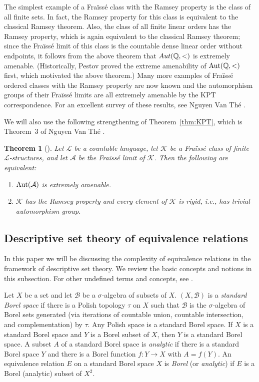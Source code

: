 \documentclass{amsart}
\newtheorem{theorem}{Theorem}[section]
\theoremstyle{definition}
\theoremstyle{remark}
\begin{document}
The simplest example of a Fra\"iss\'e class with the Ramsey property is the class of all finite sets. In fact, the Ramsey property for this class is equivalent to the classical Ramsey theorem. Also, the class of all finite linear orders has the Ramsey property, which is again equivalent to the classical Ramsey theorem; since the Fra\"iss\'e limit of this class is the countable dense linear order without endpoints, it follows from the above theorem that ${\rm Aut}(\mathbb{Q}, <)$ is extremely amenable. (Historically, Pestov \cite{Pestov98} proved the extreme amenability of $\mbox{\rm Aut}(\mathbb{Q},<)$ first, which motivated the above theorem.) Many more examples of Fra\"iss\'e ordered classes with the Ramsey property are now known and the automorphism groups of their Fra\"iss\'e limits are all extremely amenable by the KPT correspondence. For an excellent survey of these results, see Nguyen Van Th\'e \cite{NVT}. 

We will also use the following strengthening of Theorem~\ref{thm:KPT}, which is Theorem~3 of Nguyen Van Th\'e \cite{NVT}.

\begin{theorem}[\cite{NVT}]\label{thm:KPTstrong} Let $\mathcal{L}$ be a countable language, let $\mathcal{K}$ be a Fra\"iss\'e class of finite $\mathcal{L}$-structures, and let $\mathcal{A}$ be the Fra\"iss\'e limit of $\mathcal{K}$. Then the following are equivalent:
\begin{enumerate}
\item[\rm (1)] $\mbox{\rm Aut}(\mathcal{A})$ is extremely amenable.
\item[\rm (2)] $\mathcal{K}$ has the Ramsey property and every element of $\mathcal{K}$ is rigid, i.e., has trivial automorphism group.
\end{enumerate}
\end{theorem}



\subsection{Descriptive set theory of equivalence relations\label{subsec:er}}
In this paper we will be discussing the complexity of equivalence relations in the framework of descriptive set theory. We review the basic concepts and notions in this subsection. For other undefined terms and concepts, see \cite{GaoBook}.

Let $X$ be a set and let $\mathcal{B}$ be a $\sigma$-algebra of subsets of $X$. $(X, \mathcal{B})$ is a {\em standard Borel space} if there is a Polish topology $\tau$ on $X$ such that $\mathcal{B}$ is the $\sigma$-algebra of Borel sets generated (via iterations of countable union, countable intersection, and complementation) by $\tau$. Any Polish space is a standard Borel space. If $X$ is a standard Borel space and $Y$ is a Borel subset of $X$, then $Y$ is a standard Borel space. A subset $A$ of a standard Borel space is {\em analytic} if there is a standard Borel space $Y$ and there is a Borel function $f\colon Y\to X$ with $A=f(Y)$. An equivalence relation $E$ on a standard Borel space $X$ is {\em Borel} (or {\em analytic}) if $E$ is a Borel (analytic) subset of $X^2$. 
\end{document}
